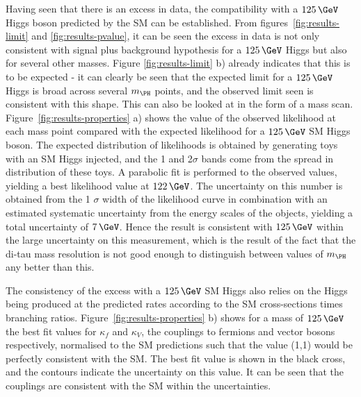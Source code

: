 Having seen that there is an excess in data, the compatibility with a $125\,\GeV$
Higgs boson predicted by the \ac{SM} can be established. From figures~\ref{fig:results-limit} 
and \ref{fig:results-pvalue}, it can be seen the excess
in data is not only consistent with signal plus background hypothesis for a
$125\,\GeV$ Higgs but also for several other masses. Figure
\ref{fig:results-limit} b) already indicates that this is to be expected - it
can clearly be seen that the expected limit for a $125\,\GeV$ Higgs is broad
across several $m_{\PH}$ points, and the observed limit seen is consistent
with this shape. This can also be looked at in the form of a mass scan. Figure~\ref{fig:results-properties} 
a) shows the value of the observed likelihood at
each mass point compared with the expected likelihood for a $125\,\GeV$ \ac{SM}
Higgs boson. The expected distribution of likelihoods is obtained by generating
toys with an \ac{SM} Higgs injected, and the 1 and 2$\sigma$ bands come from the
spread in distribution of these toys. A parabolic fit is performed to the
observed values, yielding a best likelihood value at $122\,\GeV$. The uncertainty
on this number is obtained from the 1 $\sigma$ width of the likelihood curve in
combination with an estimated systematic uncertainty from the energy scales of
the objects, yielding a total uncertainty of $7\,\GeV$. Hence the result is
consistent with $125\,\GeV$ within the large uncertainty on this measurement,
which is the result of the fact that the di-tau mass resolution is not good
enough to distinguish between values of $m_{\PH}$ any better than this.

The consistency of the excess with a $125\,\GeV$ \ac{SM} Higgs also relies on the
Higgs being produced at the predicted rates according to the \ac{SM}
cross-sections times branching ratios. Figure~\ref{fig:results-properties} b) shows
for a mass of $125\,\GeV$ the  best fit values for $\kappa_{f}$ and $\kappa_{V}$,
the couplings to fermions and vector bosons respectively, normalised to the
\ac{SM} predictions such that the value (1,1) would be perfectly consistent with
the \ac{SM}. The best fit value is shown in the black cross, and the contours
indicate the uncertainty on this value. It can be seen that the couplings are
consistent with the \ac{SM} within the uncertainties.

